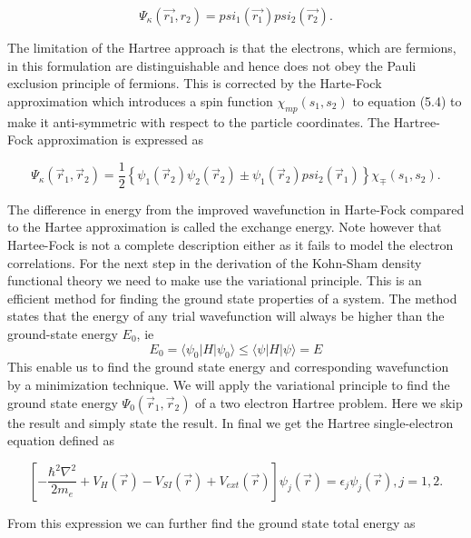 \begin{equation}
\Psi_{\kappa}(\vec{r_1}, r_2) = psi_1(\vec{r_1})psi_2(\vec{r_2}).
\end{equation}

The limitation of the Hartree approach is that the electrons, which are fermions, in this formulation are distinguishable and hence does not obey the Pauli exclusion principle of fermions. This is corrected by the Harte-Fock approximation which introduces a spin function $\chi_{mp}(s_1, s_2)$ to equation (5.4) to make it anti-symmetric with respect to the particle coordinates. The Hartree-Fock approximation is expressed as

\begin{equation}
\Psi_{\kappa}(\vec{r}_1, \vec{r}_2) = \frac{1}{2} \left\{ \psi_1(\vec{r}_2) \psi_2(\vec{r}_2) \pm \psi_1(\vec{r}_2) psi_2(\vec{r}_1) \right\} \chi_{\mp}(s_1, s_2).
\end{equation}  

The difference in energy from the improved wavefunction in Harte-Fock compared to the Hartee approximation is called the exchange energy. Note however that Hartee-Fock is not a complete description either as it fails to model the electron correlations. For the next step in the derivation of the Kohn-Sham density functional theory we need to make use the variational principle. This is an efficient method for finding the ground state properties of a system. The method states that the energy of any trial wavefunction will always be higher than the ground-state energy $E_0$, ie
\begin{equation}
    E_0 = \langle\psi_0|H|\psi_0\rangle \leq \langle\psi|H|\psi\rangle = E
\end{equation}
This enable us to find the ground state energy and corresponding wavefunction by a minimization technique. We will apply the variational principle to find the ground state energy $\Psi_0(\vec{r}_1, \vec{r}_2)$ of a two electron Hartree problem. Here we skip the result and simply state the result. In final we get the Hartree single-electron equation defined as

\begin{equation}
\left[ -\frac{\hbar^2\nabla^2}{2m_e} + V_H(\vec{r}) - V_{SI}(\vec{r}) + V_{ext}(\vec{r}) \right] \psi_j(\vec{r}) = \epsilon_j \psi_j(\vec{r}), j = 1, 2.
\end{equation}
 
From this expression we can further find the ground state total energy as 
 
